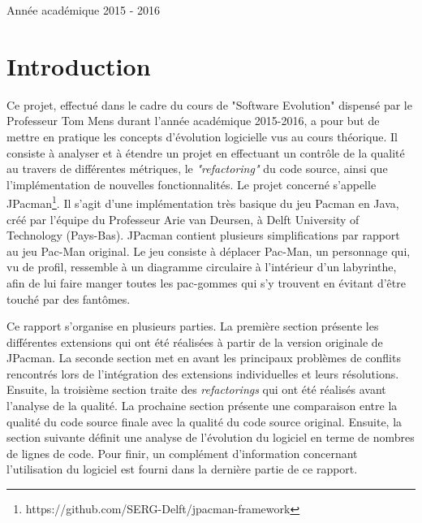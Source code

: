 \documentclass[12pt, openany]{report}
\begin{document}
\begin{titlepage}
\begin{sffamily}
\begin{center}
    \vfill

    {\large Année académique 2015 - 2016}
	
  \end{center}
  \end{sffamily}
\end{titlepage}


	\setcounter{secnumdepth}{3}
	\setcounter{tocdepth}{3}

\newpage

	\renewcommand{\thesection}{\arabic{section}}
	\tableofcontents
	\newpage

	

\section{Introduction}
Ce projet, effectué dans le cadre du cours de "Software Evolution" dispensé par le Professeur Tom Mens durant l'année académique 2015-2016, a pour but de mettre en pratique les concepts d'évolution logicielle vus au cours théorique. Il consiste à analyser et à étendre un projet en effectuant un contrôle de la qualité au travers de différentes métriques, le \textit{"refactoring"} du code source, ainsi que l'implémentation de nouvelles fonctionnalités. Le projet concerné s'appelle JPacman\footnote{https://github.com/SERG-Delft/jpacman-framework}. Il s'agit d'une implémentation très basique du jeu Pacman en Java, créé par l'équipe  du Professeur Arie van Deursen, à Delft University of Technology (Pays-Bas).
 JPacman contient plusieurs simplifications par rapport au jeu Pac-Man original. Le jeu consiste à déplacer Pac-Man, un personnage qui, vu de profil, ressemble à un diagramme circulaire à l’intérieur d’un labyrinthe, afin de lui faire manger toutes les pac-gommes qui s’y trouvent en évitant d’être touché par des fantômes.
 
Ce rapport s'organise en plusieurs parties. La première section présente les différentes extensions qui ont été réalisées à partir de la version originale de JPacman. La seconde section met en avant les principaux problèmes de conflits rencontrés lors de l'intégration des extensions individuelles et leurs résolutions. Ensuite, la troisième section traite des \textit{refactorings} qui ont été réalisés avant l'analyse de la qualité. La prochaine section présente une comparaison entre la qualité du code source finale avec la qualité du code source original. Ensuite, la section suivante définit une analyse de l'évolution du logiciel en terme de nombres de lignes de code. Pour finir, un complément d'information concernant l'utilisation du logiciel est fourni dans la dernière partie de ce rapport. 
\end{document}
